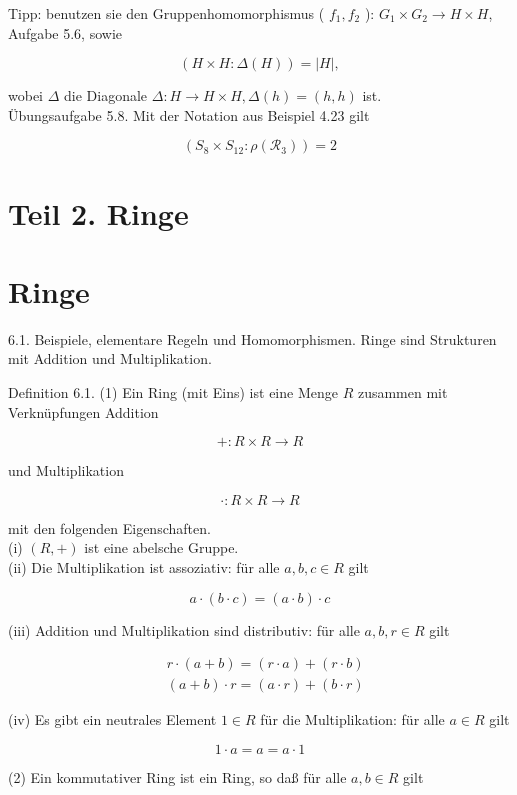 \documentclass[10pt, letterpaper]{article}
\begin{document}
Tipp: benutzen sie den Gruppenhomomorphismus ( $f_{1}, f_{2}$ ): $G_{1} \times G_{2} \rightarrow H \times H$, Aufgabe 5.6, sowie

$$
(H \times H: \Delta(H))=|H|,
$$

wobei $\Delta$ die Diagonale $\Delta: H \rightarrow H \times H, \Delta(h)=(h, h)$ ist.\\
Übungsaufgabe 5.8. Mit der Notation aus Beispiel 4.23 gilt

$$
\left(S_{8} \times S_{12}: \rho\left(\mathscr{R}_{3}\right)\right)=2
$$


\pagebreak


\section{Teil 2. Ringe}


\section*{Ringe}
6.1. Beispiele, elementare Regeln und Homomorphismen. Ringe sind Strukturen mit Addition und Multiplikation.

Definition 6.1. (1) Ein Ring (mit Eins) ist eine Menge $R$ zusammen mit Verknüpfungen Addition

$$
+: R \times R \rightarrow R
$$

und Multiplikation

$$
\cdot: R \times R \rightarrow R
$$

mit den folgenden Eigenschaften.\\
(i) $(R,+)$ ist eine abelsche Gruppe.\\
(ii) Die Multiplikation ist assoziativ: für alle $a, b, c \in R$ gilt

$$
a \cdot(b \cdot c)=(a \cdot b) \cdot c
$$

(iii) Addition und Multiplikation sind distributiv: für alle $a, b, r \in R$ gilt

$$
\begin{aligned}
& r \cdot(a+b)=(r \cdot a)+(r \cdot b) \\
& (a+b) \cdot r=(a \cdot r)+(b \cdot r)
\end{aligned}
$$

(iv) Es gibt ein neutrales Element $1 \in R$ für die Multiplikation: für alle $a \in R$ gilt

$$
1 \cdot a=a=a \cdot 1
$$

(2) Ein kommutativer Ring ist ein Ring, so daß für alle $a, b \in R$ gilt
\end{document}
